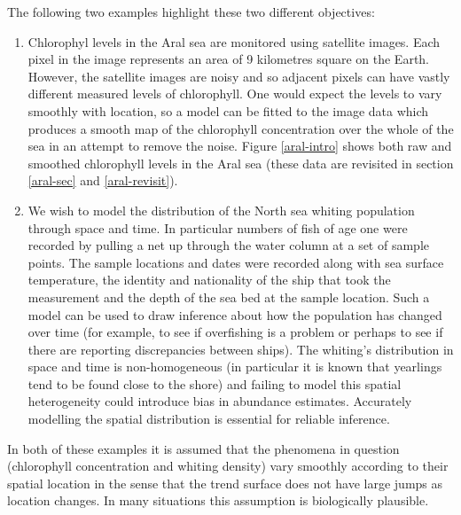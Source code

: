 The following two examples highlight these two different objectives:
\begin{enumerate}
\item Chlorophyl levels in the Aral sea are monitored using satellite images. Each pixel in the image represents an area of 9 kilometres square on the Earth. However, the satellite images are noisy and so adjacent pixels can have vastly different measured levels of chlorophyll. One would expect the levels to vary smoothly with location, so a model can be fitted to the image data which produces a smooth map of the chlorophyll concentration over the whole of the sea in an attempt to remove the noise. Figure \ref{aral-intro} shows both raw and smoothed chlorophyll levels in the Aral sea (these data are revisited in section \ref{aral-sec} and \ref{aral-revisit}).
\item We wish to model the distribution of the North sea whiting population through space and time. In particular numbers of fish of age one were recorded by pulling a net up through the water column at a set of sample points. The sample locations and dates were recorded along with sea surface temperature, the identity and nationality of the ship that took the measurement and the depth of the sea bed at the sample location. Such a model can be used to draw inference about how the population has changed over time (for example, to see if overfishing is a problem or perhaps to see if there are reporting discrepancies between ships). The whiting's distribution in space and time is non-homogeneous (in particular it is known that yearlings tend to be found close to the shore) and failing to model this spatial heterogeneity could introduce  bias in abundance estimates. Accurately modelling the spatial distribution is essential for reliable inference.
\end{enumerate}
In both of these examples it is assumed that the phenomena in question (chlorophyll concentration and whiting density) vary smoothly according to their spatial location in the sense that the trend surface does not have large jumps as location changes. In many situations this assumption is biologically plausible.

